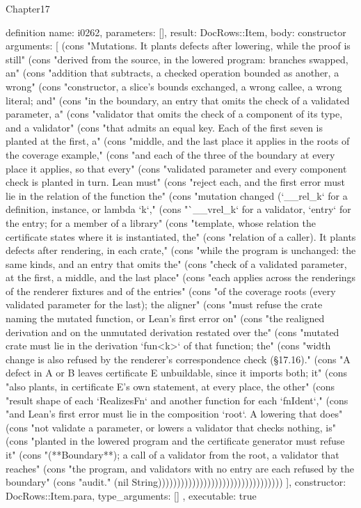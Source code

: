 \begin{lexlean}{Chapter17}
\begin{semanticmodule}
definition{
  name: i0262,
  parameters: [],
  result: DocRows::Item,
  body: constructor{
    arguments: [
      (cons "Mutations. It plants defects after lowering, while the proof is still" (cons "derived from the source, in the lowered program: branches swapped, an" (cons "addition that subtracts, a checked operation bounded as another, a wrong" (cons "constructor, a slice's bounds exchanged, a wrong callee, a wrong literal; and" (cons "in the boundary, an entry that omits the check of a validated parameter, a" (cons "validator that omits the check of a component of its type, and a validator" (cons "that admits an equal key. Each of the first seven is planted at the first, a" (cons "middle, and the last place it applies in the roots of the coverage example," (cons "and each of the three of the boundary at every place it applies, so that every" (cons "validated parameter and every component check is planted in turn. Lean must" (cons "reject each, and the first error must lie in the relation of the function the" (cons "mutation changed (`__rel_k` for a definition, instance, or lambda `k`," (cons "`__vrel_k` for a validator, `entry` for the entry; for a member of a library" (cons "template, whose relation the certificate states where it is instantiated, the" (cons "relation of a caller). It plants defects after rendering, in each crate," (cons "while the program is unchanged: the same kinds, and an entry that omits the" (cons "check of a validated parameter, at the first, a middle, and the last place" (cons "each applies across the renderings of the renderer fixtures and of the entries" (cons "of the coverage roots (every validated parameter for the last); the aligner" (cons "must refuse the crate naming the mutated function, or Lean's first error on" (cons "the realigned derivation and on the unmutated derivation restated over the" (cons "mutated crate must lie in the derivation `fun<k>` of that function; the" (cons "width change is also refused by the renderer's correspondence check (§17.16)." (cons "A defect in A or B leaves certificate E unbuildable, since it imports both; it" (cons "also plants, in certificate E's own statement, at every place, the other" (cons "result shape of each `RealizesFn` and another function for each `fnIdent`," (cons "and Lean's first error must lie in the composition `root`. A lowering that does" (cons "not validate a parameter, or lowers a validator that checks nothing, is" (cons "planted in the lowered program and the certificate generator must refuse it" (cons "(**Boundary**); a call of a validator from the root, a validator that reaches" (cons "the program, and validators with no entry are each refused by the boundary" (cons "audit." (nil String)))))))))))))))))))))))))))))))))
    ],
    constructor: DocRows::Item.para,
    type_arguments: []
  },
  executable: true
}


\end{semanticmodule}
\end{lexlean}
